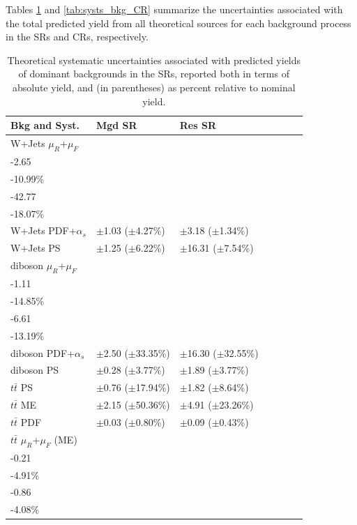 \captionsetup[figure]{list=yes}

Tables \ref{tab:systs_bkg_SR} and \ref{tab:systs_bkg_CR} summarize the uncertainties associated with the total predicted yield from all theoretical sources for each background process in the SRs and CRs, respectively. 

\begin{table}[ht]
\small{
\caption[Theoretical systematic uncertainties associated with predicted yields of dominant backgrounds in the signal regions.]{\label{tab:systs_bkg_SR} Theoretical systematic uncertainties associated with predicted yields of dominant backgrounds in the SRs, reported both in terms of absolute yield, and (in parentheses) as percent relative to nominal yield.}
\begin{tabular}{l l l l l l l }
\toprule
\textbf{Bkg and Syst.} & \textbf{Mgd SR} & \textbf{Res SR}\tabularnewline
\midrule
\midrule
W+Jets \(\mu_R\)+\(\mu_F\)  & \(\substack{+4.85\\-2.65}\) \big(\(\substack{+20.15\%\\-10.99\%}\)\big) & \(\substack{+33.92\\-42.77}\) \big(\(\substack{+14.33\%\\-18.07\%}\)\big) \tabularnewline
\midrule
W+Jets PDF+\(\alpha_s\) & \(\pm\)1.03 (\(\pm\)4.27\%) &\(\pm\)3.18 (\(\pm\)1.34\%) \tabularnewline
\midrule
W+Jets PS & \(\pm\)1.25 (\(\pm\)6.22\%) & \(\pm\)16.31 (\(\pm\)7.54\%) \tabularnewline
\midrule
diboson \(\mu_R\)+\(\mu_F\) & \(\substack{+1.26\\-1.11}\) \big(\(\substack{+16.82\%\\-14.85\%}\)\big) & \(\substack{+7.62\\-6.61}\) \big(\(\substack{+15.22\%\\-13.19\%}\)\big) \tabularnewline
\midrule
diboson PDF+\(\alpha_s\) & \(\pm\)2.50 (\(\pm\)33.35\%) &\(\pm\)16.30 (\(\pm\)32.55\%) \tabularnewline
\midrule
diboson PS & \(\pm\)0.28 (\(\pm\)3.77\%) &\(\pm\)1.89 (\(\pm\)3.77\%) \tabularnewline
\midrule
\(t\bar{t}\) PS & \(\pm\)0.76 (\(\pm\)17.94\%) &\(\pm\)1.82 (\(\pm\)8.64\%) \tabularnewline
\midrule
\(t\bar{t}\) ME & \(\pm\)2.15 (\(\pm\)50.36\%) &\(\pm\)4.91 (\(\pm\)23.26\%) \tabularnewline
\midrule
\(t\bar{t}\) PDF & \(\pm\)0.03 (\(\pm\)0.80\%) &\(\pm\)0.09 (\(\pm\)0.43\%) \tabularnewline
\midrule
\(t\bar{t}\) \(\mu_R\)+\(\mu_F\) (ME) & \(\substack{+0.16\\-0.21}\) \big(\(\substack{+3.74\%\\-4.91\%}\)\big) & \(\substack{+0.59\\-0.86}\) \big(\(\substack{+2.79\%\\-4.08\%}\)\big) \tabularnewline

\end{tabular}}
\end{table}
